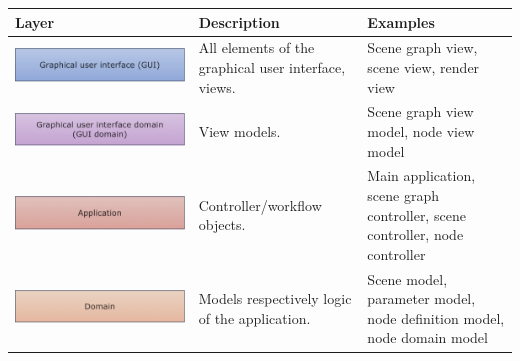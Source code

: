 \documentclass[%
    a4paper,    %
    justified,  %
    nobib,      %
    openany     %
]{tufte-book}
\begin{document}
\begin{table}[h]
  \begin{tabularx}{\textwidth}{XXX}
    \toprule
    \textbf{Layer} & \textbf{Description} & \textbf{Examples} \\
    \midrule
    \includegraphics[width=1.0\linewidth]{images/layers-gui}         & All elements of the graphical user interface, views.                                  & Scene graph view, scene view, render view                                   \\
    \includegraphics[width=1.0\linewidth]{images/layers-gui-domain}  & View models.                                                                          & Scene graph view model, node view model                                     \\
    \includegraphics[width=1.0\linewidth]{images/layers-application} & Controller/workflow objects.                                                          & Main application, scene graph controller, scene controller, node controller \\
    \includegraphics[width=1.0\linewidth]{images/layers-domain}      & Models respectively logic of the application.                                         & Scene model, parameter model, node definition model, node domain model      \\

\end{tabularx}
\end{table}
\end{document}
